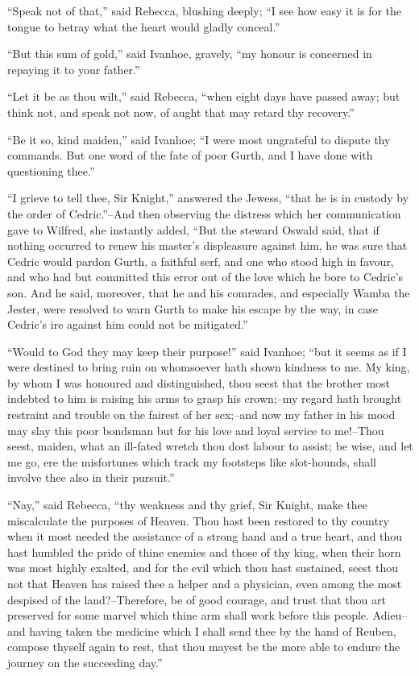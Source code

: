 ``Speak not of that,'' said Rebecca, blushing deeply; ``I see how easy
it is for the tongue to betray what the heart would gladly conceal.''

``But this sum of gold,'' said Ivanhoe, gravely, ``my honour is
concerned in repaying it to your father.''

``Let it be as thou wilt,'' said Rebecca, ``when eight days have passed
away; but think not, and speak not now, of aught that may retard thy
recovery.''

``Be it so, kind maiden,'' said Ivanhoe; ``I were most ungrateful to
dispute thy commands. But one word of the fate of poor Gurth, and I have
done with questioning thee.''

``I grieve to tell thee, Sir Knight,'' answered the Jewess, ``that he is
in custody by the order of Cedric.''--And then observing the distress
which her communication gave to Wilfred, she instantly added, ``But the
steward Oswald said, that if nothing occurred to renew his master's
displeasure against him, he was sure that Cedric would pardon Gurth, a
faithful serf, and one who stood high in favour, and who had but
committed this error out of the love which he bore to Cedric's son. And
he said, moreover, that he and his comrades, and especially Wamba the
Jester, were resolved to warn Gurth to make his escape by the way, in
case Cedric's ire against him could not be mitigated.''

``Would to God they may keep their purpose!'' said Ivanhoe; ``but it
seems as if I were destined to bring ruin on whomsoever hath shown
kindness to me. My king, by whom I was honoured and distinguished, thou
seest that the brother most indebted to him is raising his arms to grasp
his crown;--my regard hath brought restraint and trouble on the fairest
of her sex;--and now my father in his mood may slay this poor bondsman
but for his love and loyal service to me!--Thou seest, maiden, what an
ill-fated wretch thou dost labour to assist; be wise, and let me go, ere
the misfortunes which track my footsteps like slot-hounds, shall involve
thee also in their pursuit.''

``Nay,'' said Rebecca, ``thy weakness and thy grief, Sir Knight, make
thee miscalculate the purposes of Heaven. Thou hast been restored to thy
country when it most needed the assistance of a strong hand and a true
heart, and thou hast humbled the pride of thine enemies and those of thy
king, when their horn was most highly exalted, and for the evil which
thou hast sustained, seest thou not that Heaven has raised thee a helper
and a physician, even among the most despised of the land?--Therefore,
be of good courage, and trust that thou art preserved for some marvel
which thine arm shall work before this people. Adieu--and having taken
the medicine which I shall send thee by the hand of Reuben, compose
thyself again to rest, that thou mayest be the more able to endure the
journey on the succeeding day.''


